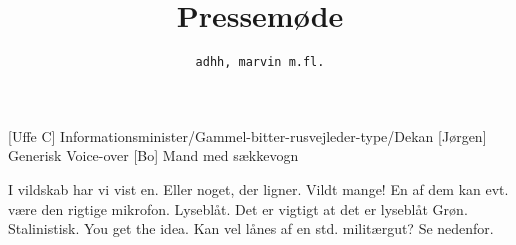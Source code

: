 \documentclass[a4paper]{article}
\title{Pressemøde}
\author{\tt adhh, marvin m.fl.}
\begin{document}
\maketitle

\begin{roles}
  [Uffe C] Informationsminister/Gammel-bitter-rusvejleder-type/Dekan
  [Jørgen] Generisk Voice-over
  [Bo] Mand med sækkevogn
\end{roles}

\begin{props}
   I vildskab har vi vist en.
   Eller noget, der ligner. Vildt mange! En af dem
  kan evt. være den rigtige mikrofon.
   Lyseblåt. Det er vigtigt at det er lyseblåt
   Grøn. Stalinistisk. You get the idea.
   Kan vel lånes af en std. militærgut?
   Se nedenfor.
\end{props}
\end{document}
